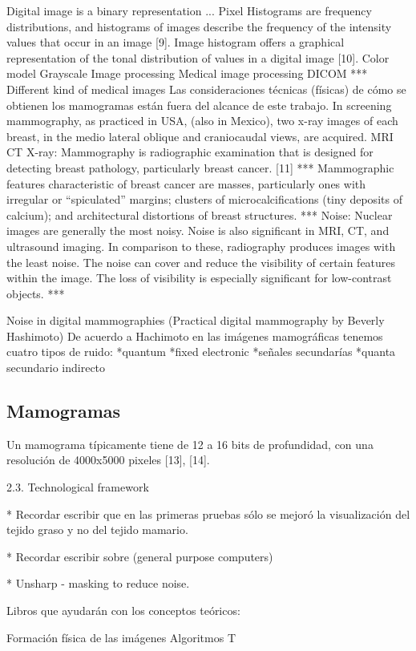 Digital image is a binary representation ...
Pixel
Histograms are frequency distributions, and histograms of images describe the frequency of the intensity values that occur in an image [9]. Image histogram offers a graphical representation of the tonal distribution of values in a digital image [10].
Color model
Grayscale
Image processing
Medical image processing
DICOM
***
Different kind of medical images
Las consideraciones técnicas (físicas) de cómo se obtienen los mamogramas están fuera del alcance de este trabajo. In screening mammography, as practiced in USA, (also in Mexico), two x-ray images of each breast, in the medio lateral oblique and craniocaudal views, are acquired. 
MRI
CT
X-ray:
Mammography is radiographic examination that is designed for detecting breast pathology, particularly breast cancer. [11]
***
Mammographic features characteristic of breast cancer are masses, particularly ones with irregular or “spiculated” margins; clusters of microcalcifications (tiny deposits of calcium); and architectural distortions of breast structures. 
***
Noise: 
Nuclear images are generally the most noisy. Noise is also significant in MRI, CT, and ultrasound imaging. In comparison to these, radiography produces images with the least noise. 
The noise can cover and reduce the visibility of certain features within the image. The loss of visibility is especially significant for low-contrast objects.
***


Noise in digital mammographies (Practical digital mammography by Beverly Hashimoto)
De acuerdo a Hachimoto en las imágenes mamográficas tenemos cuatro tipos de ruido:
*quantum
*fixed electronic
*señales secundarías
*quanta secundario indirecto

\subsection{Mamogramas}

Un mamograma típicamente tiene de 12 a 16 bits de profundidad, con una
resolución de 4000x5000 pixeles [13], [14].  

2.3. Technological framework


* Recordar escribir que en las primeras pruebas sólo se mejoró  la visualización del tejido graso y no del tejido mamario.


* Recordar escribir sobre (general purpose computers)


* Unsharp - masking to reduce noise.


Libros que ayudarán con los conceptos teóricos:


Formación física de las imágenes
Algoritmos
T
